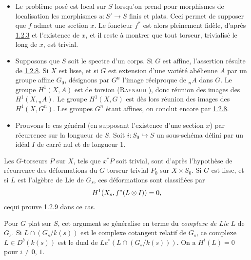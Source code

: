 \documentclass[10pt]{../fichiers-configuration-latex/smfart}
\begin{document}
\begin{itemize}
\item[a.] Le problème posé est local sur $S$ lorsqu'on prend pour
  morphismes de localisation les morphismes $u:S'\rightarrow S$ finis
  et plats. Ceci permet de supposer que $f$ admet une section
$x$. Le
  foncteur $f^{\ast}$ est alors pleinement fidèle, d'après
  \hyperref[XVIII.lem1.2.3]{1.2.3} et
  l'existence de $x$, et il reste à montrer que tout torseur,
  trivialisé le long de $x$, est trivial.

\item[b.] Supposons que $S$ soit le spectre d'un corps. Si $G$ est
  affine, l'assertion résulte de \hyperref[XVIII.lem1.2.8]{1.2.8}. Si $X$ est
  lisse, et si $G$ 
  est extension d'une variété abélienne $A$ par un groupe affine
  $G_{0}$, désignons par $G^{n}$ l'image réciproque de ${}_{n}A$ dans
  $G$. Le groupe $H^{1}(X,A)$ est de torsion (\textsc{Raynaud}
  \cite[XIII 2.6]{SGA4-18:5}),
  donc réunion des images des $H^{1}(X,{}_{n}A)$. Le groupe
  $H^{1}(X,G)$ est dès lors réunion des images des
  $H^{1}(X,G^{n})$. Les groupes $G^{n}$ étant affines, on conclut
  encore par \hyperref[XVIII.lem1.2.8]{1.2.8}.

\item[c.] Prouvons le cas général (en supposant l'existence d'une
  section $x$) par récurrence sur la longueur de $S$. Soit
  $i:S_{0}\hookrightarrow S$ un sous-schéma défini par un idéal $I$ de
  carré nul et de longueur 1.
\end{itemize}

Les $G$-torseurs $P$ sur $X$, tels que $x^{\ast}P$ soit trivial, sont
d'après l'hypothèse de récurrence des déformations du $G$-torseur
trivial $P_{0}$ sur $X\times S_{0}$. Si $G$ est lisse, et si $L$ est
l'algèbre de $\operatorname{Lie}$ de $G_{s}$, ces déformations sont classifiées par 
$$
H^{1}(X_{s},f^{\ast}(L\otimes I))=0{},
$$
ce\pageoriginale qui prouve \hyperref[XVIII.lem1.2.9]{1.2.9} dans ce cas.

Pour $G$ plat sur $S$, cet argument se généralise en terme du
\emph{complexe de Lie} $L$ de $G_{s}$. Si $L\cap (G_{s}/k(s))$ est le
complexe cotangent relatif de $G_{s}$, ce complexe $L\in
D^{b}(k(s))$ est le dual de  $Le^{\ast}(L\cap (G_{s}/k(s)))$. On a
$H^{i}(L)=0$ pour
$i\neq 0$, $1$.
\end{document}
